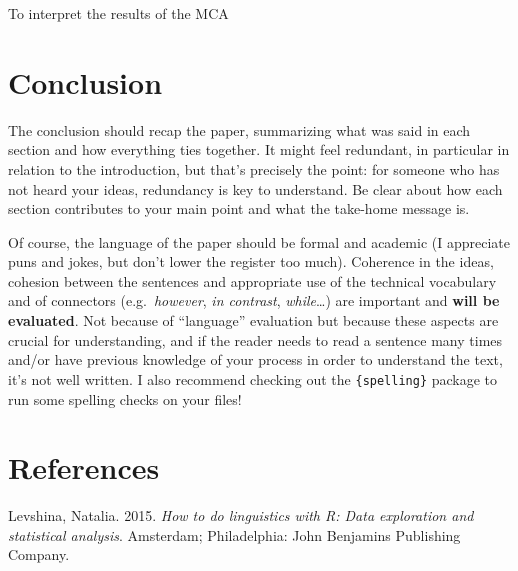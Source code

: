 \documentclass[
  letterpaper,
  DIV=11,
  numbers=noendperiod]{scrartcl}
\newlength{\cslhangindent}
\newlength{\cslentryspacingunit} %
\newenvironment{CSLReferences}[2] %
 {%
  \setlength{\parindent}{0pt}
  \ifodd #1
  \let\oldpar\par
  \def\par{\hangindent=\cslhangindent\oldpar}
  \fi
  \setlength{\parskip}{#2\cslentryspacingunit}
 }%
 {}
\begin{document}
To interpret the results of the MCA

\hypertarget{conclusion}{%
\section{Conclusion}\label{conclusion}}

The conclusion should recap the paper, summarizing what was said in each
section and how everything ties together. It might feel redundant, in
particular in relation to the introduction, but that's precisely the
point: for someone who has not heard your ideas, redundancy is key to
understand. Be clear about how each section contributes to your main
point and what the take-home message is.

Of course, the language of the paper should be formal and academic (I
appreciate puns and jokes, but don't lower the register too much).
Coherence in the ideas, cohesion between the sentences and appropriate
use of the technical vocabulary and of connectors (e.g.~\emph{however},
\emph{in contrast}, \emph{while}\ldots) are important and \textbf{will
be evaluated}. Not because of ``language'' evaluation but because these
aspects are crucial for understanding, and if the reader needs to read a
sentence many times and/or have previous knowledge of your process in
order to understand the text, it's not well written. I also recommend
checking out the \texttt{\{spelling\}} package to run some spelling
checks on your files!

\hypertarget{references}{%
\section*{References}\label{references}}

\hypertarget{refs}{}
\begin{CSLReferences}{1}{0}
\leavevmode{}%
Levshina, Natalia. 2015. \emph{How to do linguistics with {R}: Data
exploration and statistical analysis}. {Amsterdam; Philadelphia}: {John
Benjamins Publishing Company}.

\end{CSLReferences}
\end{document}
